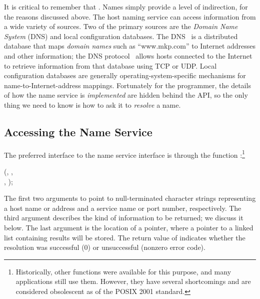 It is critical to remember that .  Names simply provide a level of indirection, for the
reasons discussed above.  The host naming service can
access information from a wide variety of sources.  Two of the primary
sources are the \emph{Domain Name System\/} (DNS) and local configuration
databases.  The DNS~\cite{RFC1034} is a distributed database
that maps \emph{domain names} such as ``www.mkp.com''
to Internet addresses and other information; the
DNS protocol~\cite{RFC1035} allows hosts connected to the Internet
to retrieve information from that database using TCP or UDP.
Local configuration databases are generally operating-system-specific
mechanisms for name-to-Internet-address mappings.
Fortunately for the programmer, the details of how the name
service is \emph{implemented\/} are hidden behind the API, so
the only thing we need to know is how to ask it to \emph{resolve\/} a
name. 

\subsection{Accessing the Name Service}

The preferred interface to the
name service interface is through the function
:\footnote{Historically, other functions
were available for this purpose, and many applications still use them.
However, they have several shortcomings and are considered
obsolescent as of the POSIX 2001 standard.}
%

\begin{inlinefcn}
  (,
,\\
\hspace*{1.1in} ,
);
\end{inlinefcn}

The first two arguments to  point to
null-terminated character strings representing a host name or address and a
service name or port number, respectively.
The third argument describes the kind of information to be
returned; we discuss it below.
The last argument is the location of a  pointer,
where a pointer to a linked list containing results will be stored.
The return value of  indicates whether the
resolution was
successful (0) or unsuccessful (nonzero error code).

